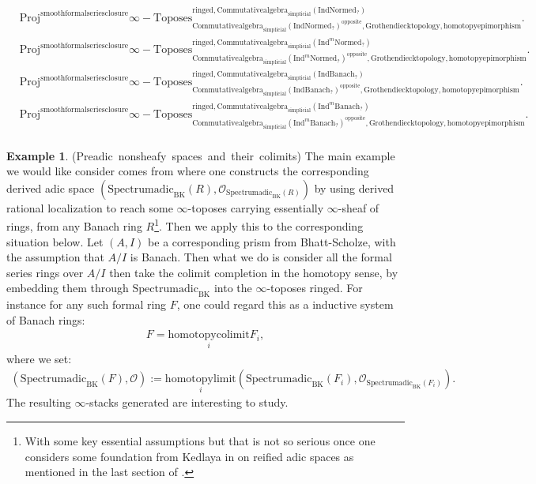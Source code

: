 \documentclass[11pt]{book}
\theoremstyle{definition}
\numberwithin{equation}{section}
\newtheorem{example}[theorem]{Example}
\begin{document}
\begin{align}
&\mathrm{Proj}^\text{smoothformalseriesclosure}\infty-\mathrm{Toposes}^{\mathrm{ringed},\mathrm{Commutativealgebra}_{\mathrm{simplicial}}(\mathrm{Ind}\mathrm{Normed}_?)}_{\mathrm{Commutativealgebra}_{\mathrm{simplicial}}(\mathrm{Ind}\mathrm{Normed}_?)^\mathrm{opposite},\mathrm{Grothendiecktopology,homotopyepimorphism}}.\\
&\mathrm{Proj}^\text{smoothformalseriesclosure}\infty-\mathrm{Toposes}^{\mathrm{ringed},\mathrm{Commutativealgebra}_{\mathrm{simplicial}}(\mathrm{Ind}^m\mathrm{Normed}_?)}_{\mathrm{Commutativealgebra}_{\mathrm{simplicial}}(\mathrm{Ind}^m\mathrm{Normed}_?)^\mathrm{opposite},\mathrm{Grothendiecktopology,homotopyepimorphism}}.\\
&\mathrm{Proj}^\text{smoothformalseriesclosure}\infty-\mathrm{Toposes}^{\mathrm{ringed},\mathrm{Commutativealgebra}_{\mathrm{simplicial}}(\mathrm{Ind}\mathrm{Banach}_?)}_{\mathrm{Commutativealgebra}_{\mathrm{simplicial}}(\mathrm{Ind}\mathrm{Banach}_?)^\mathrm{opposite},\mathrm{Grothendiecktopology,homotopyepimorphism}}.\\
&\mathrm{Proj}^\text{smoothformalseriesclosure}\infty-\mathrm{Toposes}^{\mathrm{ringed},\mathrm{Commutativealgebra}_{\mathrm{simplicial}}(\mathrm{Ind}^m\mathrm{Banach}_?)}_{\mathrm{Commutativealgebra}_{\mathrm{simplicial}}(\mathrm{Ind}^m\mathrm{Banach}_?)^\mathrm{opposite},\mathrm{Grothendiecktopology,homotopyepimorphism}}.\\ 
\end{align}


\begin{example}
\mbox{(Preadic nonsheafy spaces and their colimits)} The main example we would like consider comes from \cite{12BK} where one constructs the corresponding derived adic space $(\mathrm{Spectrumadic}_{\mathrm{BK}}(R),\mathcal{O}_{\mathrm{Spectrumadic}_{\mathrm{BK}}(R)})$ by using derived rational localization to reach some $\infty$-toposes carrying essentially $\infty$-sheaf of rings, from any Banach ring $R$\footnote{With some key essential assumptions but that is not so serious once one considers some foundation from Kedlaya in \cite{Ked2} on reified adic spaces as mentioned in the last section of \cite{12BK}.}. Then we apply this to the corresponding situation below. Let $(A,I)$ be a corresponding prism from Bhatt-Scholze, with the assumption that $A/I$ is Banach. Then what we do is consider all the formal series rings over $A/I$ then take the colimit completion in the homotopy sense, by embedding them through $\mathrm{Spectrumadic}_{\mathrm{BK}}$ into the $\infty$-toposes ringed. For instance for any such formal ring $F$, one could regard this as a inductive system of Banach rings:
\begin{align}
F=\underset{i}{\mathrm{homotopycolimit}} F_i,	
\end{align}
where we set:
\begin{align}
(\mathrm{Spectrumadic}_{\mathrm{BK}}(F),\mathcal{O}):=\underset{i}{\mathrm{homotopylimit}} (\mathrm{Spectrumadic}_{\mathrm{BK}}(F_i),\mathcal{O}_{\mathrm{Spectrumadic}_{\mathrm{BK}}(F_i)}).	
\end{align}
The resulting $\infty$-stacks generated are interesting to study. 	
\end{example}
\end{document}
